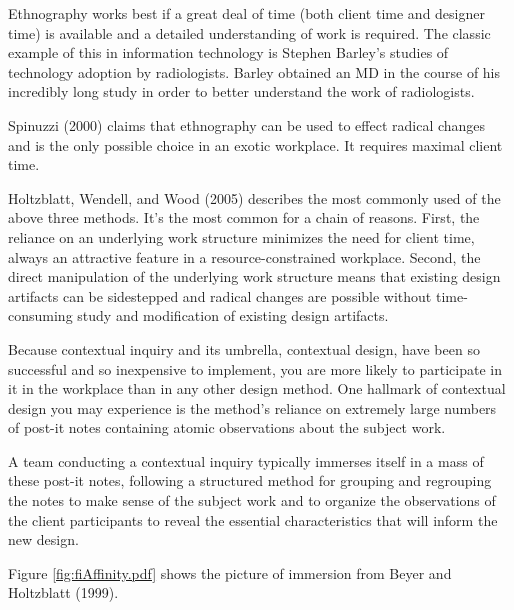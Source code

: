 \hypertarget{ethnography}{%
\label{ethnography}}

Ethnography works best if a great deal of time (both client time and
designer time) is available and a detailed understanding of work is
required. The classic example of this in information technology is
Stephen Barley's studies of technology adoption by radiologists. Barley
obtained an MD in the course of his incredibly long study in order to
better understand the work of radiologists.

Spinuzzi (2000) claims that ethnography can be used to effect radical
changes and is the only possible choice in an exotic workplace. It
requires maximal client time.

Holtzblatt, Wendell, and Wood (2005) describes the most commonly used of
the above three methods. It's the most common for a chain of reasons.
First, the reliance on an underlying work structure minimizes the need
for client time, always an attractive feature in a resource-constrained
workplace. Second, the direct manipulation of the underlying work
structure means that existing design artifacts can be sidestepped and
radical changes are possible without time-consuming study and
modification of existing design artifacts.

\hypertarget{contextual-inquiry-process}{%
\label{contextual-inquiry-process}}

Because contextual inquiry and its umbrella, contextual design, have
been so successful and so inexpensive to implement, you are more likely
to participate in it in the workplace than in any other design method.
One hallmark of contextual design you may experience is the method's
reliance on extremely large numbers of post-it notes containing atomic
observations about the subject work.

A team conducting a contextual inquiry typically immerses itself in a
mass of these post-it notes, following a structured method for grouping
and regrouping the notes to make sense of the subject work and to
organize the observations of the client participants to reveal the
essential characteristics that will inform the new design.

\hypertarget{immersion}{%
\label{immersion}}

Figure \ref{fig:fiAffinity.pdf} shows the picture of immersion from
Beyer and Holtzblatt (1999).

